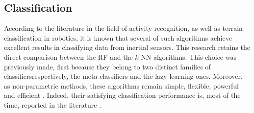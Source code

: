 \documentclass[10pt,conference]{IEEEtran}
\begin{document}





\subsection{Classification}
According to the literature in the field of activity recognition, as well as terrain classification in robotics, it is known that several of such algorithms achieve excellent results in classifying data from inertial sensors. This research retains the direct comparison between the RF and the $k$-NN algorithms. This choice was previously made, first because they belong to two distinct families of classifiers\textemdash respectively, the meta-classifiers and the lazy learning ones. Moreover, as non-parametric methods, these algorithms remain simple, flexible, powerful and efficient \cite{Russell2010}. Indeed, their satisfying classification performance is, most of the time, reported in the literature \cite{Kertesz2016, Vail2004}.

\end{document}
